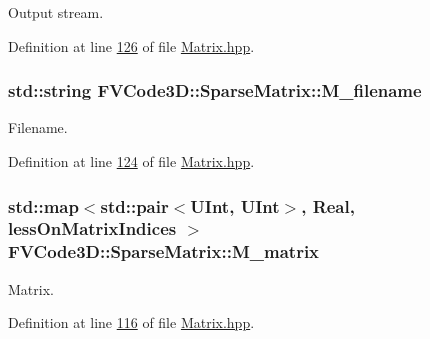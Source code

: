Output stream. 



Definition at line \hyperlink{Matrix_8hpp_source_l00126}{126} of file \hyperlink{Matrix_8hpp_source}{Matrix.\+hpp}.

\subsubsection[{\texorpdfstring{M\+\_\+filename}{M_filename}}]{\setlength{\rightskip}{0pt plus 5cm}std\+::string F\+V\+Code3\+D\+::\+Sparse\+Matrix\+::\+M\+\_\+filename\hspace{0.3cm}{\ttfamily [private]}}\hypertarget{classFVCode3D_1_1SparseMatrix_ab1c614856c8b31a81368163619fc7ba6}{}\label{classFVCode3D_1_1SparseMatrix_ab1c614856c8b31a81368163619fc7ba6}


Filename. 



Definition at line \hyperlink{Matrix_8hpp_source_l00124}{124} of file \hyperlink{Matrix_8hpp_source}{Matrix.\+hpp}.

\subsubsection[{\texorpdfstring{M\+\_\+matrix}{M_matrix}}]{\setlength{\rightskip}{0pt plus 5cm}std\+::map$<$std\+::pair$<${\bf U\+Int}, {\bf U\+Int}$>$, {\bf Real}, {\bf less\+On\+Matrix\+Indices} $>$ F\+V\+Code3\+D\+::\+Sparse\+Matrix\+::\+M\+\_\+matrix\hspace{0.3cm}{\ttfamily [private]}}\hypertarget{classFVCode3D_1_1SparseMatrix_a129734d57bfde842f4b90dcb2e8d85e3}{}\label{classFVCode3D_1_1SparseMatrix_a129734d57bfde842f4b90dcb2e8d85e3}


Matrix. 



Definition at line \hyperlink{Matrix_8hpp_source_l00116}{116} of file \hyperlink{Matrix_8hpp_source}{Matrix.\+hpp}.

